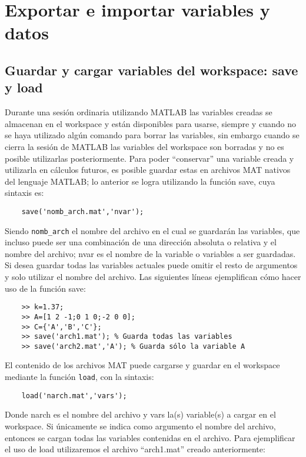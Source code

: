 \chapter{Exportar e importar variables y datos}

\section{Guardar y cargar variables del workspace: save y load}

Durante una sesión ordinaria utilizando MATLAB las variables creadas se almacenan en el 
workspace y están disponibles para usarse, siempre y cuando no se haya utilizado algún 
comando para borrar las variables, sin embargo cuando se cierra la sesión de MATLAB las 
variables del workspace son borradas y no es posible utilizarlas posteriormente. Para 
poder “conservar” una variable creada y utilizarla en cálculos futuros, es posible 
guardar estas en archivos MAT nativos del lenguaje MATLAB; lo anterior se logra utilizando 
la función save, cuya sintaxis es:

\begin{verbatim}
	save('nomb_arch.mat','nvar');
\end{verbatim}

Siendo \texttt{nomb\_arch} el nombre del archivo en el cual se guardarán las variables, 
que incluso puede ser una combinación de una dirección absoluta o relativa y el nombre 
del archivo; nvar es el nombre de la variable o variables a ser guardadas. Si desea 
guardar todas las variables actuales puede omitir el resto de argumentos y solo 
utilizar el nombre del archivo. Las siguientes líneas ejemplifican cómo hacer uso 
de la función save:

\begin{verbatim}
	>> k=1.37;
	>> A=[1 2 -1;0 1 0;-2 0 0];
	>> C={'A','B','C'};
	>> save('arch1.mat'); % Guarda todas las variables
	>> save('arch2.mat','A'); % Guarda sólo la variable A
\end{verbatim}

El contenido de los archivos MAT puede cargarse y guardar en el workspace mediante 
la función \texttt{load}, con la sintaxis:

\begin{verbatim}
	load('narch.mat','vars');
\end{verbatim}

Donde narch es el nombre del archivo y vars la(s) variable(s) a cargar en el workspace. 
Si únicamente se indica como argumento el nombre del archivo, entonces se cargan todas 
las variables contenidas en el archivo. Para ejemplificar el uso de load utilizaremos 
el archivo “arch1.mat” creado anteriormente:

